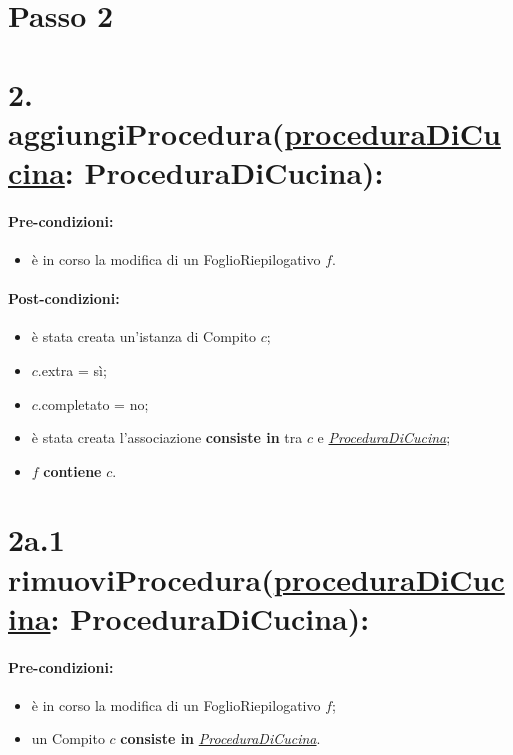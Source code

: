 \section{Passo 2}

\section*{2. aggiungiProcedura(\underline{proceduraDiCucina}: ProceduraDiCucina):}

\paragraph{Pre-condizioni:}

\begin{itemize}
    \item è in corso la modifica di un FoglioRiepilogativo $f$.
\end{itemize}

\paragraph{Post-condizioni:}

\begin{itemize}
    \item è stata creata un'istanza di Compito $c$;
    \item $c$.extra = sì;
    \item $c$.completato = no;
    \item è stata creata l'associazione \textbf{consiste in} tra $c$ e \underline{\textit{ProceduraDiCucina}};
    \item $f$ \textbf{contiene} $c$.
\end{itemize}

\section*{2a.1 rimuoviProcedura(\underline{proceduraDiCucina}: ProceduraDiCucina):}

\paragraph{Pre-condizioni:}

\begin{itemize}
    \item è in corso la modifica di un FoglioRiepilogativo $f$;
    \item un Compito $c$ \textbf{consiste in} \underline{\textit{ProceduraDiCucina}}.
\end{itemize}

